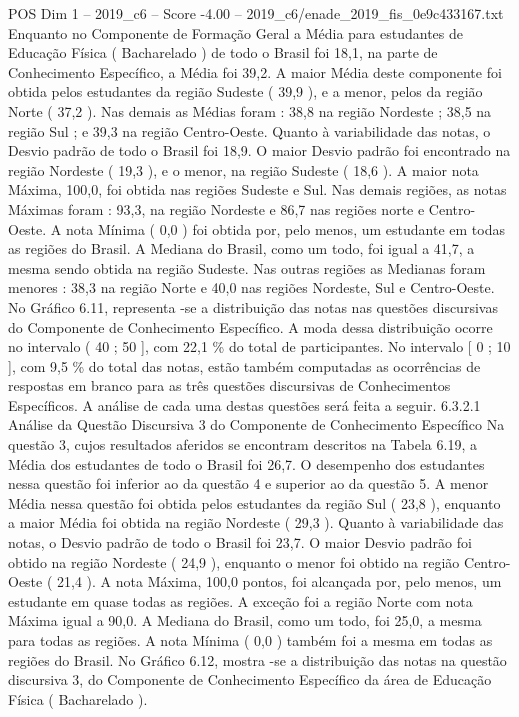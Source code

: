 \begin{textsample}{POS Dim 1 – 2019\_c6 – Score -4.00 – 2019\_c6/enade\_2019\_fis\_0e9c433167.txt}
Enquanto no Componente de Formação Geral a Média para estudantes de Educação Física ( Bacharelado ) de todo o Brasil foi 18,1, na parte de Conhecimento Específico, a Média foi 39,2.
A maior Média deste componente foi obtida pelos estudantes da região Sudeste ( 39,9 ), e a menor, pelos da região Norte ( 37,2 ).
Nas demais as Médias foram : 38,8 na região Nordeste ; 38,5 na região Sul ; e 39,3 na região Centro-Oeste.
Quanto à variabilidade das notas, o Desvio padrão de todo o Brasil foi 18,9.
O maior Desvio padrão foi encontrado na região Nordeste ( 19,3 ), e o menor, na região Sudeste ( 18,6 ).
A maior nota Máxima, 100,0, foi obtida nas regiões Sudeste e Sul.
Nas demais regiões, as notas Máximas foram : 93,3, na região Nordeste e 86,7 nas regiões norte e Centro-Oeste.
A nota Mínima ( 0,0 ) foi obtida por, pelo menos, um estudante em todas as regiões do Brasil.
A Mediana do Brasil, como um todo, foi igual a 41,7, a mesma sendo obtida na região Sudeste.
Nas outras regiões as Medianas foram menores : 38,3 na região Norte e 40,0 nas regiões Nordeste, Sul e Centro-Oeste.
No Gráfico 6.11, representa -se a distribuição das notas nas questões discursivas do Componente de Conhecimento Específico.
A moda dessa distribuição ocorre no intervalo ( 40 ; 50 ], com 22,1 \% do total de participantes.
No intervalo [ 0 ; 10 ], com 9,5 \% do total das notas, estão também computadas as ocorrências de respostas em branco para as três questões discursivas de Conhecimentos Específicos.
A análise de cada uma destas questões será feita a seguir. 6.3.2.1 Análise da Questão Discursiva 3 do Componente de Conhecimento Específico Na questão 3, cujos resultados aferidos se encontram descritos na Tabela 6.19, a Média dos estudantes de todo o Brasil foi 26,7.
O desempenho dos estudantes nessa questão foi inferior ao da questão 4 e superior ao da questão 5.
A menor Média nessa questão foi obtida pelos estudantes da região Sul ( 23,8 ), enquanto a maior Média foi obtida na região Nordeste ( 29,3 ).
Quanto à variabilidade das notas, o Desvio padrão de todo o Brasil foi 23,7.
O maior Desvio padrão foi obtido na região Nordeste ( 24,9 ), enquanto o menor foi obtido na região Centro-Oeste ( 21,4 ).
A nota Máxima, 100,0 pontos, foi alcançada por, pelo menos, um estudante em quase todas as regiões.
A exceção foi a região Norte com nota Máxima igual a 90,0.
A Mediana do Brasil, como um todo, foi 25,0, a mesma para todas as regiões.
A nota Mínima ( 0,0 ) também foi a mesma em todas as regiões do Brasil.
No Gráfico 6.12, mostra -se a distribuição das notas na questão discursiva 3, do Componente de Conhecimento Específico da área de Educação Física ( Bacharelado ).

\end{textsample}
